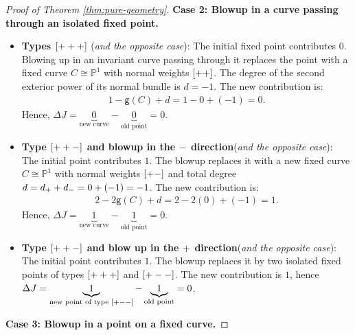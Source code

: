 \documentclass[10pt,a4paper]{amsart}
\newcommand{\lm}{\textup{\texttt{-}}}
\newcommand{\lp}{\textup{\texttt{+}}}
\begin{document}
\begin{proof}[Proof of Theorem \ref{thm:pure-geometry}]
\noindent \textbf{Case 2: Blowup in a curve passing through an isolated fixed point.}

\begin{itemize}
    \item \textbf{Types $[\lp\lp\lp]$} (\textit{and the opposite case}):  The initial fixed point contributes $0$. Blowing up in an invariant curve passing through it replaces the point with a fixed curve $C \cong \mathbb{P}^1$ with normal weights $[\lp\lp]$. The degree of the second exterior power of its normal bundle is $d=-1$. The new contribution is:
    \begin{align}
        1 - \mathsf{g}(C) + d = 1 - 0 + (-1) = 0.
    \end{align}
    Hence, $\Delta J = \underbrace{0}_{\text{new curve}} - \underbrace{0}_{\text{old point}} = 0$.

    \item \textbf{Type $[\lp\lp\lm]$ and blowup in the $\lm$ direction}(\textit{and the opposite case}): The initial point contributes $1$. The blowup replaces it with a new fixed curve $C \cong \mathbb{P}^1$ with normal weights $[\lp\lm]$ and total degree $d=d_\lp+d_\lm = 0+(-1)=-1$. The new contribution is:
    \begin{align}
        2 - 2\mathsf{g}(C) + d = 2 - 2(0) + (-1) = 1.
    \end{align}
    Hence, $\Delta J =\underbrace{1} _{\text{new curve}} - \underbrace{1}_{\text{old point}} = 0$.

    \item \textbf{Type $[\lp\lp\lm]$ and blow up in the $\lp$ direction}(\textit{and the opposite case}):
     The initial point contributes $1$. The blowup replaces it by two isolated fixed points of types $[\lp\lp\lp]$ and $[\lp\lm\lm]$. The new contribution is $1$, hence $\Delta J=\underbrace{1}_{\text{new point of type }[\lp\lm\lm]}-\underbrace{1}_{\text{old point}}=0$.
\end{itemize}

\noindent \textbf{Case 3: Blowup in a point on a fixed curve.}


\end{proof}
\end{document}
